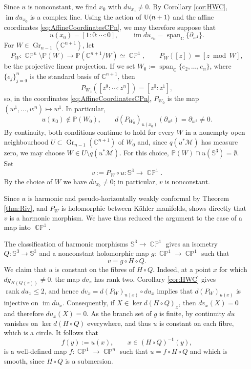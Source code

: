 \documentclass[11pt]{article}
\theoremstyle{plain}
\numberwithin{equation}{section}
\theoremstyle{definition}
\let\oldendproof\endproof
\renewenvironment{proof}[1][\proofname]{%
\oldproof[\upshape \bfseries #1]%
}{\oldendproof}
\def \C{\mathbb{C}}
\def \p{\partial}
\def \mc{\mathcal}
\def \mb{\mathbb}
\def \tp{\textup}
\DeclareMathOperator{\CP}{\mathbb{CP}}
\begin{document}
\begin{proof}
 Since $u$ is nonconstant, we find $x_0$ with
$du_{x_0}\neq0$.  By Corollary \ref{cor:HWC},
$\operatorname{im}du_{x_0}$ is a complex line.  Using the action of
$\tp{U}(n+1)$ and the affine coordinates
\eqref{eq:AffineCoordinatesCPn}, we may therefore suppose that
\[
    u(x_0)=[1:0:\cdots:0],
    \qquad
    \operatorname{im}du_{x_0}
    =\operatorname{span}_{\C}\{\partial_{w^1}\}.
\]
For $W\in\operatorname{Gr}_{n-1}(\C^{n+1})$, let
\[
    P_W\colon\CP^n\setminus\mathbb P(W)\longrightarrow
    \mathbb P(\C^{n+1}/W)\simeq\CP^1,
    \qquad
    P_W([z])=[z\bmod W],
\]
be the projective linear projection. If we set
$W_0:=\operatorname{span}_{\C}\{e_2,\ldots,e_n\}$, where $\{e_j\}_{j=0}^{n}$ is the standard basis of $\C^{n+1}$,  then
\[
    P_{W_0}([z^0:\cdots:z^n])=[z^0:z^1],
\]
so, in the coordinates \eqref{eq:AffineCoordinatesCPn}, $P_{W_0}$ is the
map $(w^1,\ldots,w^n)\mapsto w^1$.  In particular,
\[
    u(x_0)\notin\mathbb P(W_0),
    \qquad
    d(P_{W_0})_{u(x_0)}(\partial_{w^1}) =\p_{w^1}\neq0.
\]
By continuity, both conditions continue to hold for every $W$ in a nonempty open
neighbourhood $U\subset\operatorname{Gr}_{n-1}(\C^{n+1})$ of $W_0$ and,
since $q(u^* \mc M)$ has measure
zero, we may choose $W\in U\setminus q(u^* \mc M)$.  For this choice,
$\mathbb P(W)\cap u(\mb S^3)=\emptyset$.  Set
\[
    v:=P_W\circ u\colon\mb S^3\to\CP^1.
\]
By the choice of $W$ we have $dv_{x_0}\neq0$;
in particular, $v$ is nonconstant.

Since $u$ is harmonic and pseudo-horizontally weakly conformal by Theorem
\ref{thm:Riv}, and $P_W$ is holomorphic between K\"ahler manifolds,
\cite[Proposition~8.2.4(ii)]{Baird2003} shows directly that $v$ is
a harmonic morphism. We have thus reduced the argument to the case of a map into $\CP^1$.  

The
classification of harmonic morphisms $\mb S^3\to \CP^1$
\cite[Theorem~6.7.7 and Remark~6.7.8]{Baird2003} gives an isometry
$Q\colon\mb S^3\to\mb S^3$ and a nonconstant holomorphic map
$g\colon\CP^1\to\CP^1$ such that
\begin{equation}
    \label{eq:ProjectedHopfFactorization}
    v=g\circ H\circ Q.
\end{equation}
We claim that $u$ is constant on the fibres of $H\circ Q$.  Indeed, at a
point $x$ for which $dg_{H(Q(x))}\neq0$, the map $dv_x$ has rank two.
Corollary \ref{cor:HWC} gives $\operatorname{rank}du_x\leq2$, and hence
$dv_x=d(P_W)_{u(x)}\circ du_x$ implies that $d(P_W)_{u(x)}$ is injective on
$\operatorname{im}du_x$.  Consequently, if
$X\in\ker d(H\circ Q)_x$, then $dv_x(X)=0$ and therefore $du_x(X)=0$.
As the branch set of $g$ is finite, by continuity
$du$ vanishes on $\ker d(H\circ Q)$ everywhere, and  thus $u$ is constant on
each fibre, which is a circle. It follows that
\[
    f(y):=u(x),\qquad x\in(H\circ Q)^{-1}(y),
\]
is a well-defined map $f\colon\CP^1\to\CP^n$ such that
$u=f\circ H\circ Q$ and which is smooth, since $H\circ Q$ is a submersion.


\end{proof}
\end{document}

